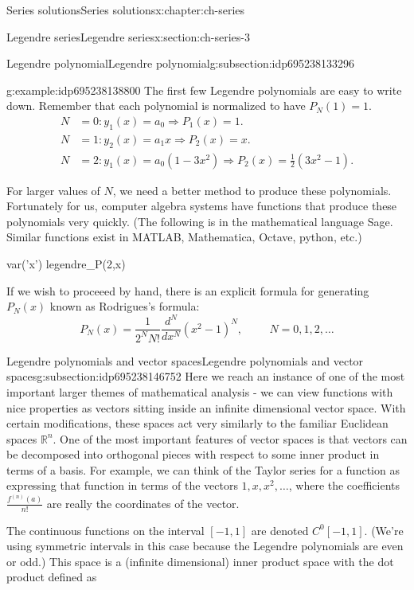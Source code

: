 \documentclass[oneside,10pt,]{book}
\numberwithin{equation}{section}
\newcommand{\R}{\mathbb{R}}
\numberwithin{equation}{section}
\newcommand{\amp}{&}
\begin{document}
\begin{chapterptx}{Series solutions}{}{Series solutions}{}{}{x:chapter:ch-series}
\begin{sectionptx}{Legendre series}{}{Legendre series}{}{}{x:section:ch-series-3}
\begin{subsectionptx}{Legendre polynomial}{}{Legendre polynomial}{}{}{g:subsection:idp695238133296}
\begin{example}{}{g:example:idp695238138800}
The first few Legendre polynomials are easy to write down. Remember that each polynomial is normalized to have \(P_N(1) = 1\).%
\begin{align*}
N \amp= 0:y_1(x) = a_0 \Rightarrow P_1(x) = 1.\\
N \amp= 1: y_2(x) = a_1 x \Rightarrow P_2(x) = x.\\
N \amp= 2: y_1(x) = a_0(1 - 3x^2) \Rightarrow P_2(x) = \frac{1}{2}(3x^2 -1).  
\end{align*}
%
\end{example}
For larger values of \(N\), we need a better method to produce these polynomials. Fortunately for us, computer algebra systems have functions that produce these polynomials very quickly. (The following is in the mathematical language Sage. Similar functions exist in MATLAB, Mathematica, Octave, python, etc.)%
\begin{sageinput}
var('x')
legendre_P(2,x)
\end{sageinput}
If we wish to proceeed by hand, there is an explicit formula for generating \(P_N(x)\) known as Rodrigues's formula:%
\begin{equation*}
P_N(x) = \frac{1}{2^N N!} \frac{d^N}{dx^N} (x^2 - 1)^N, \hspace{1cm} N = 0, 1, 2, \ldots
\end{equation*}
%
\end{subsectionptx}
%
%
\typeout{************************************************}
\typeout{************************************************}
%
\begin{subsectionptx}{Legendre polynomials and vector spaces}{}{Legendre polynomials and vector spaces}{}{}{g:subsection:idp695238146752}
Here we reach an instance of one of the most important larger themes of mathematical analysis - we can view functions with nice properties as vectors sitting inside an infinite dimensional vector space. With certain modifications, these spaces act very similarly to the familiar Euclidean spaces \(\R^n\). One of the most important features of vector spaces is that vectors can be decomposed into orthogonal pieces with respect to some inner product in terms of a basis. For example, we can think of the Taylor series for a function as expressing that function in terms of the vectors \(1, x, x^2, \ldots\), where the coefficients \(\frac{f^{(n)}(a)}{n!}\) are really the coordinates of the vector.%
\par
The continuous functions on the interval \([-1,1]\) are denoted \(C^0[-1,1]\). (We're using symmetric intervals in this case because the Legendre polynomials are even or odd.) This space is a (infinite dimensional) inner product space with the dot product defined as%

\end{subsectionptx}
\end{sectionptx}
\end{chapterptx}
\end{document}
